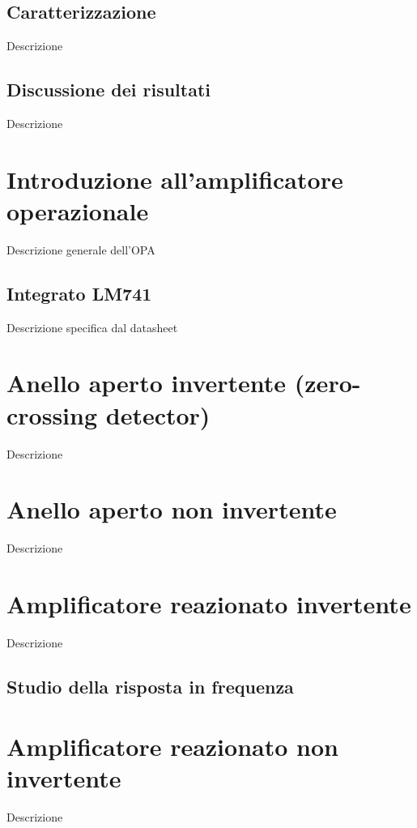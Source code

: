 \documentclass[journal]{IEEEtran}
\begin{document}
\subsection{\textbf{Caratterizzazione}}
Descrizione

\subsection{\textbf{Discussione dei risultati}}
Descrizione


\section{\textbf{Introduzione all'amplificatore operazionale}}
Descrizione generale dell'OPA %

\subsection{\textbf{Integrato LM741}}
Descrizione specifica dal datasheet


\section{\textbf{Anello aperto invertente (zero-crossing detector)}} %
Descrizione


\section{\textbf{Anello aperto non invertente}} %
Descrizione


\section{\textbf{Amplificatore reazionato invertente}} %
Descrizione

\subsection{Studio della risposta in frequenza}


\section{\textbf{Amplificatore reazionato non invertente}} %
Descrizione
\end{document}
